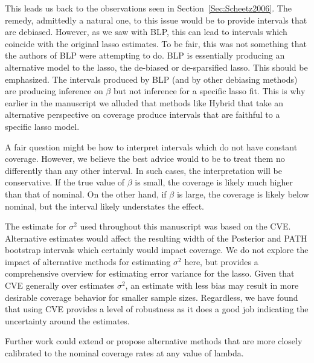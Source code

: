 This leads us back to the observations seen in Section~\ref{Sec:Scheetz2006}. The remedy, admittedly a natural one, to this issue would be to provide intervals that are debiased. However, as we saw with BLP, this can lead to intervals which coincide with the original lasso estimates. To be fair, this was not something that the authors of BLP were attempting to do. BLP is essentially producing an alternative model to the lasso, the de-biased or de-sparsified lasso. This should be emphasized. The intervals produced by BLP (and by other debiasing methods) are producing inference on $\beta$ but not inference for a specific lasso fit. This is why earlier in the manuscript we alluded that methods like Hybrid that take an alternative perspective on coverage produce intervals that are faithful to a specific lasso model.

A fair question might be how to interpret intervals which do not have constant coverage. However, we believe the best advice would to be to treat them no differently than any other interval. In such cases, the interpretation will be conservative. If the true value of $\beta$ is small, the coverage is likely much higher than that of nominal. On the other hand, if $\beta$ is large, the coverage is likely below nominal, but the interval likely understates the effect.

The estimate for $\sigma^2$ used throughout this manuscript was based on the CVE. Alternative estimates would affect the resulting width of the Posterior and PATH bootstrap intervals which certainly would impact coverage. We do not explore the impact of alternative methods for estimating $\sigma^2$ here, but \cite{Reid2016} provides a comprehensive overview for estimating error variance for the lasso. Given that CVE generally over estimates $\sigma^2$, an estimate with less bias may result in more desirable coverage behavior for smaller sample sizes. Regardless, we have found that using CVE provides a level of robustness as it does a good job indicating the uncertainty around the estimates.

Further work could extend or propose alternative methods that are more closely calibrated to the nominal coverage rates at any value of lambda.
